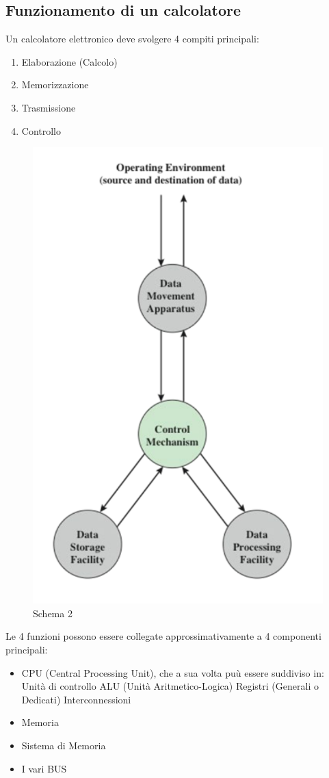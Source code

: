 \documentclass{article}
\begin{document}
	\subsection{Funzionamento di un calcolatore}
	Un calcolatore elettronico deve svolgere 4 compiti principali:
	\begin{enumerate}
		\item Elaborazione (Calcolo)
		\item Memorizzazione
		\item Trasmissione
		\item Controllo
	\end{enumerate}
	\begin{figure}[h]
		\centering
		\includegraphics[scale=0.5]{3.png}
		\caption{Schema 2}
		\label{fig:im-3}
	\end{figure}
	Le 4 funzioni possono essere collegate approssimativamente a 4 componenti principali:
	\begin{itemize}
		\item CPU (Central Processing Unit), che a sua volta puù essere suddiviso in:
		\subitem Unità di controllo
		\subitem ALU (Unità Aritmetico-Logica)
		\subitem Registri (Generali o Dedicati)
		\subitem Interconnessioni
		\item Memoria
		\item Sistema di Memoria
		\item I vari BUS
	\end{itemize}
\end{document}
